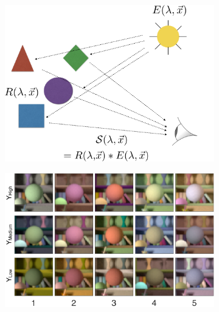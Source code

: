 \documentclass{jov}
\begin{document}
\begin{figure}[h]
\centering
\begin{subfigure}{0.4 \textwidth}
		\centering
        \includegraphics[width=\textwidth]{Figure1/introSchematic.png}
        \caption{}
        \label{fig:introSchematic}
    \end{subfigure}
    \begin{subfigure}{0.45 \textwidth}   
        \includegraphics[width=\textwidth]{Figure1/introExampleFigure.jpeg}
        \caption{}
        \label{fig:introExampleFigure}
    \end{subfigure}
    \label{introFigure}

\end{figure}
\end{document}
